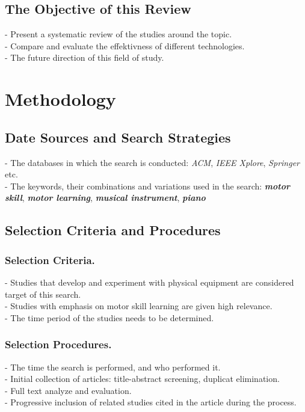\documentclass[sigconf]{acmart}
\begin{document}
\subsection{The Objective of this Review}
- Present a systematic review of the studies around the topic.\\
- Compare and evaluate the effektivness of different technologies.\\
- The future direction of this field of study.

\section{Methodology}

\subsection{Date Sources and Search Strategies}
- The databases in which the search is conducted: \textit{ACM}, \textit{IEEE Xplore}, \textit{Springer} etc.\\
- The keywords, their combinations and variations used in the search: \textit{\textbf{motor skill}}, \textit{\textbf{motor learning}}, \textit{\textbf{musical instrument}}, \textit{\textbf{piano}}

\subsection{Selection Criteria and Procedures}

\subsubsection{Selection Criteria.\\}
- Studies that develop and experiment with physical equipment are considered target of this search.\\
- Studies with emphasis on motor skill learning are given high relevance.\\
- The time period of the studies needs to be determined.

\subsubsection{Selection Procedures.\\}
- The time the search is performed, and who performed it.\\
- Initial collection of articles: title-abstract screening, duplicat elimination.\\
- Full text analyze and evaluation.\\
- Progressive inclusion of related studies cited in the article during the process.
\end{document}
